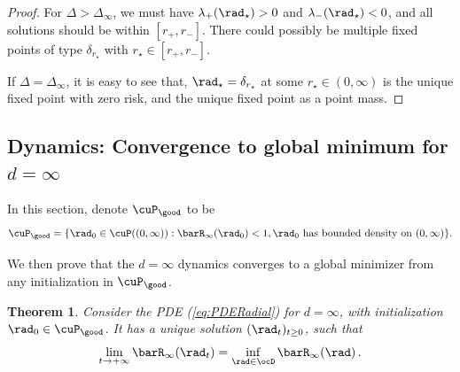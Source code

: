 \documentclass[11pt]{article}
\newtheorem{theorem}{Theorem}
\begin{document}
\begin{proof}
For $\Delta > \Delta_\infty$, we must have $\lambda_+(\rad_\star) > 0$ and $\lambda_-(\rad_\star) < 0$, and all solutions should be within $[r_+, r_-]$. There could possibly be multiple fixed points of type $\delta_{r_\star}$ with $r_\star \in [r_+, r_-]$. 


If  $\Delta = \Delta_\infty$, it is easy to see that, $\rad_\star = \delta_{r_\star}$ at some $r_\star \in (0, \infty)$ is the unique fixed point with zero risk, and the unique fixed point as a point mass. 
\end{proof}


\subsection{Dynamics: Convergence to global minimum for $d=\infty$}


In this section, denote $\cuP_{\good}$ to be 
\begin{align}\label{eqn:goodset_isotropic_infty}
\cuP_{\good} = \{\rad_0 \in \cuP((0, \infty)): \barR_\infty(\rad_0) < 1, \rad_0 \text{ has bounded density on } (0, \infty) \}.
\end{align}

We then prove that the $d=\infty$ dynamics converges to a global minimizer from any initialization 
in $\cuP_{\good}$.
%


\begin{theorem}\label{thm:PDE_converge_to_global_minimizer}
Consider the PDE (\ref{eq:PDERadial}) for $d=\infty$, with initialization $\rad_0\in\cuP_{\good}$. It has a unique solution $(\rad_t)_{t \ge 0}$, such that
\[
\lim_{t\rightarrow +\infty} \barR_\infty(\rad_t) = \inf_{\rad \in \ocD} \barR_\infty(\rad)\, .
\] 
\end{theorem}
%
\end{document}
